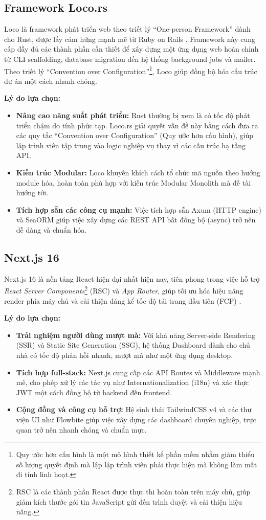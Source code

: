 \subsection{Framework Loco.rs}
Loco là framework phát triển web theo triết lý ``One-person Framework'' dành cho Rust, được lấy cảm hứng mạnh mẽ từ Ruby on Rails \cite{LocoRS}. Framework này cung cấp đầy đủ các thành phần cần thiết để xây dựng một ứng dụng web hoàn chỉnh từ CLI scaffolding, database migration đến hệ thống background jobs và mailer. Theo triết lý ``Convention over Configuration''\footnote{Quy ước hơn cấu hình là một mô hình thiết kế phần mềm nhằm giảm thiểu số lượng quyết định mà lập lập trình viên phải thực hiện mà không làm mất đi tính linh hoạt.}, Loco giúp đồng bộ hóa cấu trúc dự án một cách nhanh chóng.

\textbf{Lý do lựa chọn:}
\begin{itemize}
    \item \textbf{Nâng cao năng suất phát triển:} Rust thường bị xem là có tốc độ phát triển chậm do tính phức tạp. Loco.rs giải quyết vấn đề này bằng cách đưa ra các quy tắc ``Convention over Configuration'' (Quy ước hơn cấu hình), giúp lập trình viên tập trung vào logic nghiệp vụ thay vì các cấu trúc hạ tầng API.
    \item \textbf{Kiến trúc Modular:} Loco khuyến khích cách tổ chức mã nguồn theo hướng module hóa, hoàn toàn phù hợp với kiến trúc Modular Monolith mà đề tài hướng tới.
    \item \textbf{Tích hợp sẵn các công cụ mạnh:} Việc tích hợp sẵn Axum (HTTP engine) và SeaORM giúp việc xây dựng các REST API bất đồng bộ (async) trở nên dễ dàng và chuẩn hóa.
\end{itemize}

\subsection{Next.js 16}
Next.js 16 là nền tảng React hiện đại nhất hiện nay, tiên phong trong việc hỗ trợ \textit{React Server Components}\footnote{RSC là các thành phần React được thực thi hoàn toàn trên máy chủ, giúp giảm kích thước gói tin JavaScript gửi đến trình duyệt và cải thiện hiệu năng.} (RSC) và \textit{App Router}, giúp tối ưu hóa hiệu năng render phía máy chủ và cải thiện đáng kể tốc độ tải trang đầu tiên (FCP) \cite{NextJS}.

\textbf{Lý do lựa chọn:}
\begin{itemize}
    \item \textbf{Trải nghiệm người dùng mượt mà:} Với khả năng Server-side Rendering (SSR) và Static Site Generation (SSG), hệ thống Dashboard dành cho chủ nhà có tốc độ phản hồi nhanh, mượt mà như một ứng dụng desktop.
    \item \textbf{Tích hợp full-stack:} Next.js cung cấp các API Routes và Middleware mạnh mẽ, cho phép xử lý các tác vụ như Internationalization (i18n) và xác thực JWT một cách đồng bộ từ backend đến frontend.
    \item \textbf{Cộng đồng và công cụ hỗ trợ:} Hệ sinh thái TailwindCSS v4 và các thư viện UI như Flowbite giúp việc xây dựng các dashboard chuyên nghiệp, trực quan trở nên nhanh chóng và chuẩn mực.
\end{itemize}

